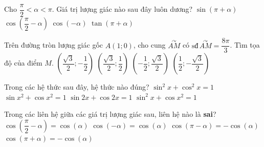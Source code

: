 

\begin{ex}%
	Cho $\dfrac{\pi}{2} < \alpha < \pi$. Giá trị lượng giác nào sau đây  luôn dương?
	\choice 
		{$\sin  \left(\pi+\alpha \right)$}
		{\True $\cos  \left(\dfrac{\pi}{2}-\alpha \right)$}
		{$\cos  \left(-\alpha \right)$}
		{$\tan \left(\pi+\alpha \right)$} 
\end{ex}

\begin{ex}%
	Trên đường tròn lượng giác gốc $A(1;0)$, cho cung $\overset{\curvearrowright}{AM}$ có $\text{sđ}\,\overset{\curvearrowright}{AM}=\dfrac{8\pi}{3}$.  Tìm tọa độ của điểm $M$.
	 \choice
		{$\left( \dfrac{\sqrt{3}}{2}; -\dfrac{1}{2} \right)$} 
		{$\left( \dfrac{\sqrt{3}}{2};  \dfrac{1}{2} \right)$}
		{\True $\left(  -\dfrac{1}{2}; \dfrac{\sqrt{3}}{2} \right)$}
		 {$\left( \dfrac{1}{2}; -\dfrac{\sqrt{3}}{2} \right)$}
\end{ex}

\begin{ex}%
	Trong các hệ thức  sau đây, hệ thức nào đúng?
	 \choice
		 {\True $\sin^2x+\cos^2x=1$}
		{$\sin{x^2}+\cos{x^2}=1$} 
		 {$\sin 2x+\cos 2x=1$}
		 {$\sin^2x+\cos{x^2}=1$}
\end{ex}

\begin{ex}%
	Trong các liên hệ giữa các giá trị  lượng giác sau, liên hệ nào là \textbf{sai}?
	 \choice
		{\True $\cos\left(\dfrac{\pi}{2}-\alpha\right)=\cos(\alpha)$} 
		{$\cos(-\alpha)=\cos(\alpha)$} 
		 {$\cos(\pi-\alpha)=-\cos(\alpha)$}
		{$\cos(\pi+\alpha)=-\cos(\alpha)$} 
\end{ex}

